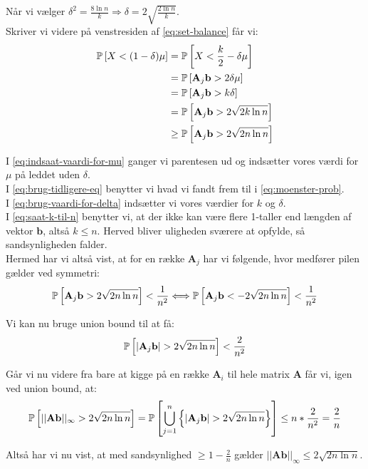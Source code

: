 Når vi vælger $\delta^2 = \frac{8 \ln n}{k} \Longrightarrow \delta = 2 \sqrt{\frac{2 \ln n}{k}}$.\\

Skriver vi videre på venstresiden af \cref{eq:set-balance} får vi:
\begin{align}
  \P{X < (1 - \delta) \mu }
  &= \P{X < \frac{k}{2} - \delta \mu } \label{eq:indsaat-vaardi-for-mu} \\
  &= \P{\mathbf A_j \mathbf b > 2 \delta \mu} \label{eq:brug-tidligere-eq} \\
  &= \P{\mathbf A_j \mathbf b > k \delta} \nonumber \\
  &= \P{\mathbf A_j \mathbf b > 2 \sqrt{2 k \ln n}} \label{eq:brug-vaardi-for-delta} \\
  &\geq \P{\mathbf A_j \mathbf b > 2 \sqrt{2 n \ln n}} \label{eq:saat-k-til-n}
\end{align}

I \cref{eq:indsaat-vaardi-for-mu} ganger vi parentesen ud og indsætter vores værdi for $\mu$ på leddet uden $\delta$.\\
I \cref{eq:brug-tidligere-eq} benytter vi hvad vi fandt frem til i \cref{eq:moenster-prob}.\\
I \cref{eq:brug-vaardi-for-delta} indsætter vi vores værdier for $k$ og $\delta$.\\
I \cref{eq:saat-k-til-n} benytter vi, at der ikke kan være flere 1-taller end længden af vektor $\mathbf b$, altså $k \leq n$. Herved bliver uligheden sværere at opfylde, så sandsynligheden falder.\\


Hermed har vi altså vist, at for en række $\mathbf A_j$ har vi følgende, hvor medfører pilen gælder ved symmetri:
$$
\P{\mathbf A_j \mathbf b > 2 \sqrt{2 n \ln n}} < \frac{1}{n^2}
\Longleftrightarrow
\P{\mathbf A_j \mathbf b < - 2 \sqrt{2 n \ln n}} < \frac{1}{n^2}
$$

Vi kan nu bruge union bound til at få:
$$
\P{|\mathbf A_j \mathbf b| > 2 \sqrt{2 n \ln n}} < \frac{2}{n^2}
$$

Går vi nu videre fra bare at kigge på en række $\mathbf A_i$ til hele matrix $\mathbf A$ får vi, igen ved union bound, at:
\begin{align*}
  \P{||\mathbf{Ab}||_\infty > 2 \sqrt{2 n \ln n}}
  = \P{ \bigcup_{j=1}^n  \curly{|\mathbf A_j \mathbf b| > 2 \sqrt{2 n \ln n}} }
  \leq n * \frac{2}{n^2}
  = \frac{2}{n}
\end{align*}



Altså har vi nu vist, at med sandsynlighed $\geq 1 - \frac{2}{n}$ gælder $||\mathbf{Ab}||_\infty \leq 2 \sqrt{2 n \ln n}$.










